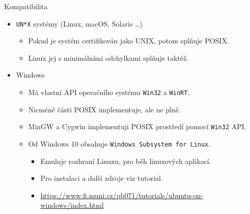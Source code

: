 \documentclass[handout]{beamer}
\begin{document}
\begin{frame}{Kompatibilita}
    \begin{itemize}
        \item \texttt{UN*X} systémy (Linux, macOS, Solaris \ldots)
            \begin{itemize}
                \item Pokud je systém certifikován jako UNIX, potom splňuje POSIX.
                \item Linux jej s minimálními odchylkami splňuje taktéž.
            \end{itemize}
        \item{Windows}
            \begin{itemize}
                \item Má vlastní API operačního systému \texttt{Win32} a \texttt{WinRT}.
                \item Nicméně části POSIX implementuje, ale ne plně.
                \item MinGW a Cygwin implementuji POSIX prostředí pomocí \texttt{Win32} API.
                \item Od Windows 10 obsahuje \texttt{Windows Subsystem for Linux}.
                    \begin{itemize}
                        \item Emuluje rozhraní Linuxu, pro běh linuxových aplikací.
                        \item Pro instalaci a další zdroje viz tutorial.
                        \item \url{https://www.fi.muni.cz/pb071/tutorials/ubuntu-on-windows/index.html}
                    \end{itemize}
            \end{itemize}
    \end{itemize}
\end{frame}
\end{document}
